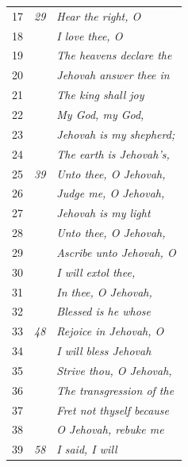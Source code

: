 \documentclass{article}
\newlength{\minipageheight}
\newlength{\minipagewidth}
\begin{document}
\begin{minipage}[r][\minipageheight][t]{\minipagewidth}
\begin{longtable}{ccl}
        17          & \textit{29} & \textit{Hear the right, O}          \\
        18          &             & \textit{I love thee, O}             \\
        19          &             & \textit{The heavens declare the}    \\
        20          &             & \textit{Jehovah answer thee in}     \\
        21          &             & \textit{The king shall joy}         \\
        22          &             & \textit{My God, my God,}            \\
        23          &             & \textit{Jehovah is my shepherd;}    \\
        24          &             & \textit{The earth is Jehovah’s,}    \\
        25          & \textit{39} & \textit{Unto thee, O Jehovah,}      \\
        26          &             & \textit{Judge me, O Jehovah,}       \\
        27          &             & \textit{Jehovah is my light}        \\
        28          &             & \textit{Unto thee, O Jehovah,}      \\
        29          &             & \textit{Ascribe unto Jehovah, O}    \\
        30          &             & \textit{I will extol thee,}         \\
        31          &             & \textit{In thee, O Jehovah,}        \\
        32          &             & \textit{Blessed is he whose}        \\
        33          & \textit{48} & \textit{Rejoice in Jehovah, O}      \\
        34          &             & \textit{I will bless Jehovah}       \\
        35          &             & \textit{Strive thou, O Jehovah,}    \\
        36          &             & \textit{The transgression of the}   \\
        37          &             & \textit{Fret not thyself because}   \\
        38          &             & \textit{O Jehovah, rebuke me}       \\
        39          & \textit{58} & \textit{I said, I will}             \\

\end{longtable}
\end{minipage}
\end{document}

